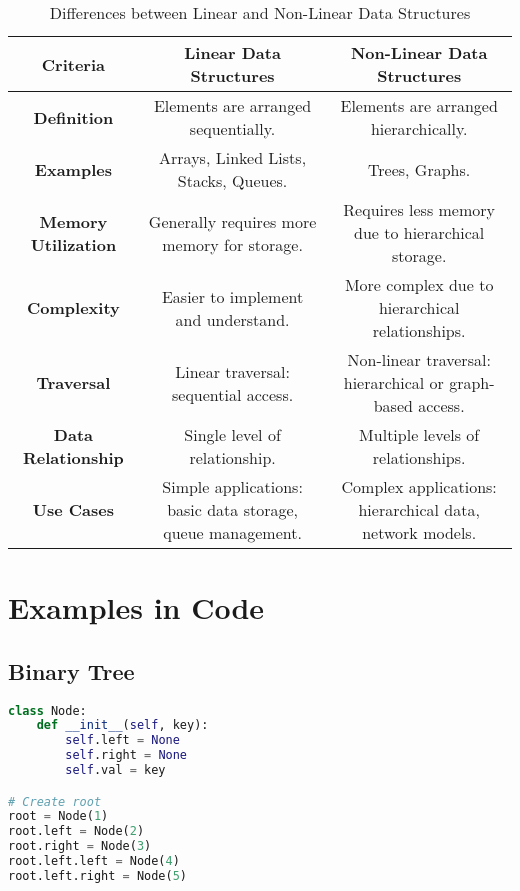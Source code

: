 \documentclass{article}
\begin{document}
\begin{table}[h!]
    \centering
    \begin{tabular}{|c|c|c|}
        \hline
        \textbf{Criteria} & \textbf{Linear Data Structures} & \textbf{Non-Linear Data Structures} \\
        \hline
        \textbf{Definition} & Elements are arranged sequentially. & Elements are arranged hierarchically. \\
        \hline
        \textbf{Examples} & Arrays, Linked Lists, Stacks, Queues. & Trees, Graphs. \\
        \hline
        \textbf{Memory Utilization} & Generally requires more memory for storage. & Requires less memory due to hierarchical storage. \\
        \hline
        \textbf{Complexity} & Easier to implement and understand. & More complex due to hierarchical relationships. \\
        \hline
        \textbf{Traversal} & Linear traversal: sequential access. & Non-linear traversal: hierarchical or graph-based access. \\
        \hline
        \textbf{Data Relationship} & Single level of relationship. & Multiple levels of relationships. \\
        \hline
        \textbf{Use Cases} & Simple applications: basic data storage, queue management. & Complex applications: hierarchical data, network models. \\
        \hline
    \end{tabular}
    \caption{Differences between Linear and Non-Linear Data Structures}
    \label{tab:linear_vs_nonlinear}
\end{table}

\section{Examples in Code}

\subsection{Binary Tree}

\begin{lstlisting}[language=Python, caption=Binary Tree Node implementation]
class Node:
    def __init__(self, key):
        self.left = None
        self.right = None
        self.val = key

# Create root
root = Node(1)
root.left = Node(2)
root.right = Node(3)
root.left.left = Node(4)
root.left.right = Node(5)
\end{lstlisting}
\end{document}
